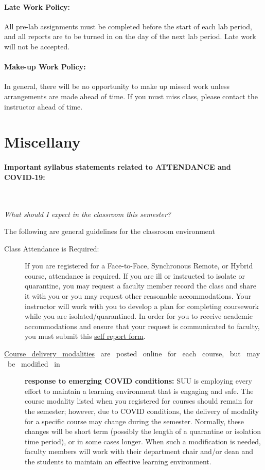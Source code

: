 \documentclass[12pt, letterpaper]{article}
\begin{document}
\paragraph{Late Work Policy:}
All pre-lab assignments must be completed before the start of each lab period, and all reports are to be turned in on the day of the next lab period. Late work will not be accepted.

\paragraph{Make-up Work Policy:}
In general, there will be no opportunity to make up missed work unless arrangements are made ahead of time. If you must miss class, please contact the instructor ahead of time.

\section*{Miscellany}

\paragraph{Important syllabus statements related to ATTENDANCE and COVID-19:} ~

\noindent\emph{What should I expect in the classroom this semester?}

\noindent The following are general guidelines for the classroom environment
\begin{description}
	\item[Class Attendance is Required:] If you are registered for a Face-to-Face, Synchronous Remote, or Hybrid course, attendance is required. If you are ill or instructed to isolate or quarantine, you may request a faculty member record the class and share it with you or you may request other reasonable accommodations. Your instructor will work with you to develop a plan for completing coursework while you are isolated/quarantined. In order for you to receive academic accommodations and ensure that your request is communicated to faculty, you must submit this \href{https://my.suu.edu/covid/selfreport/}{self report form}.
	\item[\href{https://www.suu.edu/registrar/onlinehybrid.html}{Course ~delivery ~modalities} ~are ~posted ~online ~for ~each ~course, ~but ~may ~be ~modified ~in] \textbf{response to emerging COVID conditions:} SUU is employing every effort to maintain a learning environment that is engaging and safe. The course modality listed when you registered for courses should remain for the semester; however, due to COVID conditions, the delivery of modality for a specific course may change during the semester. Normally, these changes will be short term (possibly the length of a quarantine or isolation time period), or in some cases longer. When such a modification is needed, faculty members will work with their department chair and/or dean and the students to maintain an effective learning environment.
\end{description}
\end{document}
